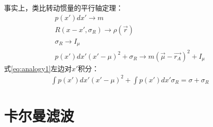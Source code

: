 事实上，类比转动惯量的平行轴定理：
\begin{gather}
    p(x')dx'\rightarrow m\\
    R(x-x',\sigma_{R})\rightarrow \rho(\overrightarrow{r})\\
    \sigma_{R}\rightarrow I_{\mu}\\
    p(x')dx'(x'-\mu)^{2}+\sigma_{R}\rightarrow m(\overrightarrow{\mu} -\overrightarrow{r_{A}})^{2}+I_{\mu}\label{eq:analogy1}
\end{gather}
式\ref{eq:analogy1}左边对$x'$积分：
\begin{gather}
    \int p(x')dx'(x'-\mu)^{2} + \int p(x')dx'\sigma_{R}=\sigma+\sigma_{R}
\end{gather}

\section{卡尔曼滤波}
